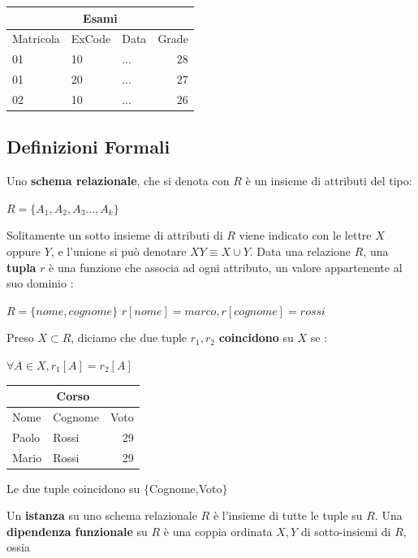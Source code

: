 \documentclass[12pt, letterpaper]{article}
\begin{document}
\begin{center}
    \begin{tabular}{|l|l|l|r|}
        \hline
        \multicolumn{4}{|c|}{Esami}   \\\hline
        Matricola  & ExCode & Data & Grade  \\ \hline
        01  & 10 & ... & 28  \\ \hline
        01  & 20 & ... & 27  \\ \hline
        02  & 10 & ... & 26  \\ \hline
        \end{tabular}
\end{center}
\subsection{Definizioni Formali}\label{Def}
Uno \textbf{schema relazionale}, che si denota con \(R\) è un insieme di attributi del tipo:\begin{center}
    \(R=\{A_1,A_2,A_3...,A_k\}\)
\end{center}
Solitamente un sotto insieme di attributi di \(R\) viene indicato con le lettre \(X\) oppure \(Y\),
e l'unione si può denotare \(XY\equiv X\cup Y\). 
Data una relazione \(R\), una \textbf{tupla} \(r\) è una funzione che associa ad ogni attributo, 
un valore appartenente al suo dominio : \begin{center}
    \(
      R=\{nome,cognome\}\)   \(r[nome]=marco, r[cognome]=rossi  
    \)
\end{center}
Preso \(X\subset R\), diciamo che due tuple \(r_1,r_2\) \textbf{coincidono} su \(X\) se :\begin{center}
    \(\forall A\in X,r_1[A]=r_2[A]\)
\end{center}
\begin{center}
    \begin{tabular}{|l|l|r|}
        \hline
        \multicolumn{3}{|c|}{Corso}   \\\hline
        Nome  & Cognome & Voto  \\ \hline
        Paolo  & Rossi & 29 \\ \hline
        Mario  & Rossi & 29\\ \hline
        \end{tabular}
        Le due tuple coincidono su \(\{\)Cognome,Voto\(\}\)
\end{center}
Un \textbf{istanza} su uno schema relazionale \(R\) è l'insieme di tutte le tuple su \(R\).
Una \textbf{dipendenza funzionale} su \(R\) è una coppia ordinata \(X,Y\) di sotto-insiemi di \(R\), ossia 
\end{document}

